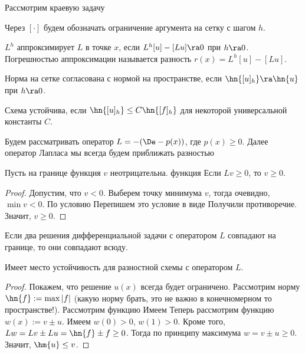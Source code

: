 \documentclass[a4paper]{article}
\begin{document}
Рассмотрим краевую задачу 

Через $[\cdot]$ будем обозначать ограничение аргумента на сетку с
шагом $h$.

\begin{df}
$L^h$ аппроксимирует $L$ в точке $x$, если $L^h[u]- [Lu]\ra 0$ при
  $h\ra 0$.  Погрешностью аппроксимации называется разность $r(x) =
  L^h[u]-[Lu]$.
\end{df}

\begin{df}
Норма на сетке согласована с нормой на пространстве, если $\hn{[u]_h}
\ra \hn{u}$ при $h\ra 0$.
\end{df}

\begin{df}
Схема устойчива, если $\hn{[u]_h} \le C \hn{[f]_h}$ для некоторой
универсальной константы $C$.
\end{df}

Будем рассматривать оператор $L = -(\De - p(x))$, где $p(x) \ge 0$.
Далее оператор Лапласа мы всегда будем приближать разностью


\begin{theorem}
Пусть на границе функция $v$ неотрицательна. функция Если ${L v\ge
  0}$, то $v\ge 0$.
\end{theorem}
\begin{proof}
Допустим, что $v < 0$. Выберем точку минимума $v$, тогда очевидно,
$\min v < 0$.  По условию   Перепишем это условие в виде   Получили противоречие. Значит, $v \ge 0$.
\end{proof}

\begin{imp}
Если два решения дифференциальной задачи с оператором $L$ совпадают на
границе, то они совпадают всюду.
\end{imp}


\begin{stm}
Имеет место устойчивость для разностной схемы с оператором $L$.
\end{stm}
\begin{proof}
Покажем, что решение $u(x)$ всегда будет ограничено.  Рассмотрим норму
$\hn{f} := \max |f|$ (какую норму брать, это не важно в конечномерном
то пространстве!).  Рассмотрим функцию   Имеем   Теперь
рассмотрим функцию $w(x):= v \pm u$.  Имеем $w(0) > 0$, $w(1) >
0$. Кроме того, $L w = L v \pm L u = \hn{f} \pm f \ge 0$.  Тогда по
принципу максимума $w = v \pm u \ge 0$. Значит, $\hm{u}\le v$.
\end{proof}
\end{document}
